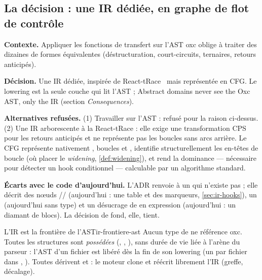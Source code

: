 \subsection{La décision : une IR dédiée, en graphe de flot de contrôle}

\begin{decision}
\textbf{Contexte.} Appliquer les fonctions de transfert sur l'AST oxc oblige à traiter \og des dizaines de formes équivalentes\fg{} (déstructuration, court-circuits, ternaires, retours anticipés).

\textbf{Décision.} Une IR dédiée, inspirée de React-tRace~\cite{LeeAhnYi2025} mais représentée en CFG. Le lowering est la seule couche qui lit l'AST ; \og Abstract domains never see the Oxc AST, only the IR\fg{} (section \emph{Consequences}).

\textbf{Alternatives refusées.} (1) Travailler sur l'AST : refusé pour la raison ci-dessus. (2) Une IR arborescente à la React-tRace : elle exige une transformation CPS pour les retours anticipés et ne représente pas les boucles sans arcs arrière. Le CFG représente nativement , boucles et , identifie structurellement les en-têtes de boucle (où placer le \emph{widening}, \cref{def:widening}), et rend la dominance --- nécessaire pour détecter un hook conditionnel --- calculable par un algorithme standard.

\textbf{Écarts avec le code d'aujourd'hui.} L'ADR renvoie à un  qui n'existe pas ; elle décrit des nœuds // (aujourd'hui : une table  et des marqueurs, \cref{sec:ir-hooks}), un  (aujourd'hui sans type) et un désucrage de  en expression  (aujourd'hui : un diamant de blocs). La décision de fond, elle, tient.
\end{decision}

\begin{invariant}{L'IR est la frontière de l'AST}{ir-frontiere-ast}
Aucun type de  ne référence oxc. Toutes les structures sont \emph{possédées} (, , ), sans durée de vie liée à l'arène du parseur : l'AST d'un fichier est libéré dès la fin de son lowering (un  par fichier dans , ). Toutes dérivent  et  : le moteur clone et réécrit librement l'IR (greffe, décalage).
\end{invariant}

